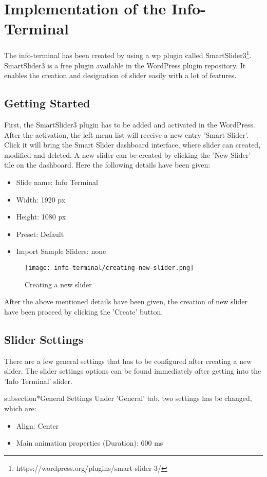 \chapter{Implementation of the Info-Terminal}
The info-terminal has been created by using a \ac{wp} plugin called SmartSlider3\footnote{https://wordpress.org/plugins/smart-slider-3/}. SmartSlider3 is a free plugin available in the WordPress plugin repository. It enables the creation and designation of slider easily with a lot of features.

\section{Getting Started}
First, the SmartSlider3 plugin has to be added and activated in the WordPress. After the activation, the left menu list will receive a new entry 'Smart Slider'. Click it will bring the Smart Slider dashboard interface, where slider can created, modified and deleted. A new slider can be created by clicking the 'New Slider' tile on the dashboard. Here the following details have been given:
\begin{itemize}
\item Slide name: Info Terminal
\item Width: 1920 px
\item Height: 1080 px
\item Preset: Default
\item Import Sample Sliders: none
\end{itemize}
\begin{figure}[ht]
\caption{Creating a new slider}
\label{creating-a-new-slider}
\centering
\texttt{[image: info-terminal/creating-new-slider.png]}
\end{figure}

After the above mentioned details have been given, the creation of new slider have been proceed by clicking the 'Create' button.

\section{Slider Settings}
There are a few general settings that has to be configured after creating a new slider. The slider settings options can be found immediately after getting into the 'Info Terminal' slider.

subsection*{General Settings}
Under 'General' tab, two settings has be changed, which are:
\begin{itemize}
\item Align: Center
\item Main animation properties (Duration): 600 ms
\end{itemize}

